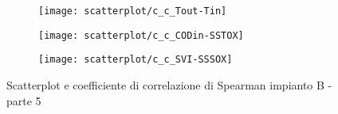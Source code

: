 \begin{sidewaysfigure}[h]\ContinuedFloat
	\renewcommand*\thesubfigure{(\arabic{subfigure})}
	\begin{subfigure}{0.49\textwidth}
		\texttt{[image: scatterplot/c\_c\_Tout-Tin]}
		\caption{}
		\centering
	\end{subfigure}
	\begin{subfigure}{0.49\textwidth}
		\texttt{[image: scatterplot/c\_c\_CODin-SSTOX]}
		\caption{}
		\centering
	\end{subfigure}

	\begin{subfigure}{0.49\textwidth}
		\texttt{[image: scatterplot/c\_c\_SVI-SSSOX]}
		\caption{}
		\centering
	\end{subfigure}
	\caption{Scatterplot e coefficiente di correlazione di Spearman impianto B - parte 5}
\end{sidewaysfigure}


